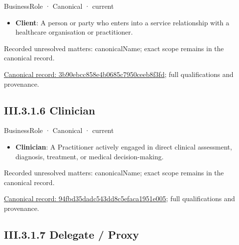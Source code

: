 \label{element:3b90ebcc858e4b0685c7950ceeb8f3fd}
{\small BusinessRole · Canonical · current}\par

\begin{itemize}


\item \textbf{Client}: A person or party who enters into a service relationship with a healthcare organisation or practitioner.

\end{itemize}

{\small Recorded unresolved matters: canonicalName; exact scope remains in the canonical record.}\par
{\footnotesize \href{../../../../continuum/business/business-role/3b90ebcc858e4b0685c7950ceeb8f3fd.md}{Canonical record: 3b90ebcc858e4b0685c7950ceeb8f3fd}; full qualifications and provenance.}\par
\subsection*{III.3.1.6 Clinician}
\label{navigation:III.3.1.6}

\label{element:94fbd35dadc543dd8c5efaca1951e005}
{\small BusinessRole · Canonical · current}\par

\begin{itemize}


\item \textbf{Clinician}: A Practitioner actively engaged in direct clinical assessment, diagnosis, treatment, or medical decision-making.

\end{itemize}

{\small Recorded unresolved matters: canonicalName; exact scope remains in the canonical record.}\par
{\footnotesize \href{../../../../continuum/business/business-role/94fbd35dadc543dd8c5efaca1951e005.md}{Canonical record: 94fbd35dadc543dd8c5efaca1951e005}; full qualifications and provenance.}\par
\subsection*{III.3.1.7 Delegate / Proxy}
\label{navigation:III.3.1.7}

